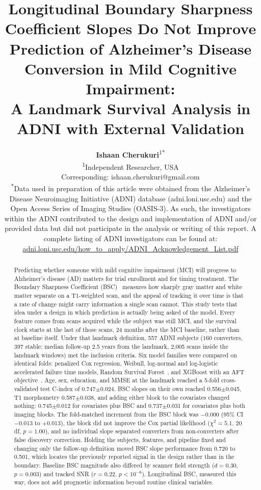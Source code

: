\documentclass[blue]{ludusofficial}  %
\title{Longitudinal Boundary Sharpness Coefficient Slopes Do Not Improve Prediction of Alzheimer's Disease Conversion in Mild Cognitive Impairment:\\[8pt]A Landmark Survival Analysis in ADNI with External Validation}
\author{%
    \textbf{Ishaan Cherukuri}\textsuperscript{1}\textsuperscript{*}\\[0.2cm]
    \small\textsuperscript{1}Independent Researcher, USA\\
    \small Corresponding: ishaan.cherukuri@gmail.com\\[0.4cm]
    \small\textsuperscript{*}Data used in preparation of this article were obtained from the Alzheimer's Disease Neuroimaging Initiative (ADNI) database (adni.loni.usc.edu) and the Open Access Series of Imaging Studies (OASIS-3). As such, the investigators within the ADNI contributed to the design and implementation of ADNI and/or provided data but did not participate in the analysis or writing of this report. A complete listing of ADNI investigators can be found at: \href{http://adni.loni.usc.edu/wp-content/uploads/how_to_apply/ADNI_Acknowledgement_List.pdf}{adni.loni.usc.edu/how\_to\_apply/ADNI\_Acknowledgement\_List.pdf}
}
\begin{document}
\begin{abstract}
Predicting whether someone with mild cognitive impairment (MCI) will progress to Alzheimer's disease (AD) matters for trial enrollment and for timing treatment. The Boundary Sharpness Coefficient (BSC)~\cite{olafson2021bsc} measures how sharply gray matter and white matter separate on a T1-weighted scan, and the appeal of tracking it over time is that a rate of change might carry information a single scan cannot. This study tests that idea under a design in which prediction is actually being asked of the model. Every feature comes from scans acquired while the subject was still MCI, and the survival clock starts at the last of those scans, 24 months after the MCI baseline, rather than at baseline itself. Under that landmark definition, 557 ADNI subjects (160 converters, 397 stable; median follow-up 2.5 years from the landmark, 2,005 scans inside the landmark windows) met the inclusion criteria. Six model families were compared on identical folds: penalized Cox regression, Weibull, log-normal and log-logistic accelerated failure time models, Random Survival Forest~\cite{ishwaran2008rsf}, and XGBoost with an AFT objective~\cite{chen2016xgboost}. Age, sex, education, and MMSE at the landmark reached a 5-fold cross-validated test C-index of 0.747$\pm$0.024. BSC slopes on their own reached 0.556$\pm$0.045, T1 morphometry 0.587$\pm$0.038, and adding either block to the covariates changed nothing: 0.745$\pm$0.012 for covariates plus BSC and 0.737$\pm$0.031 for covariates plus both imaging blocks. The fold-matched increment from the BSC block was $-0.000$ (95\% CI $-0.013$ to $+0.013$), the block did not improve the Cox partial likelihood ($\chi^2=5.1$, 20 df, $p=1.00$), and no individual slope separated converters from non-converters after false discovery correction. Holding the subjects, features, and pipeline fixed and changing only the follow-up definition moved BSC slope performance from 0.720 to 0.501, which locates the previously reported signal in the design rather than in the boundary. Baseline BSC magnitude also differed by scanner field strength ($d=0.30$, $p=0.003$) and tracked SNR ($r=0.22$, $p<10^{-6}$). Longitudinal BSC, measured this way, does not add prognostic information beyond routine clinical variables.
\end{abstract}
\end{document}
